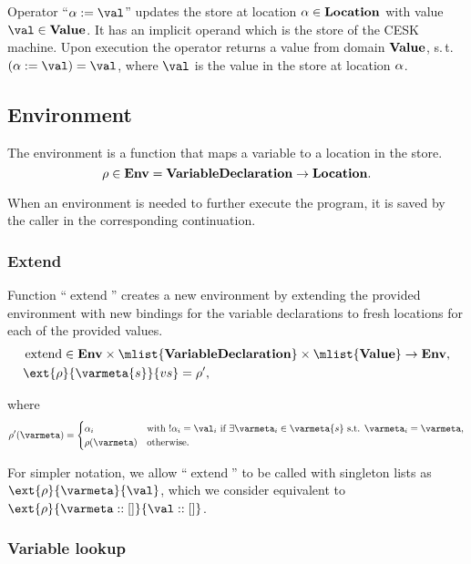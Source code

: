 \documentclass[a4paper,oneside]{article}
\DeclareMathOperator{\extend}{extend}
\begin{document}
\newcommand{\update}[2]{{#1} := {#2}}
Operator ``$\update{\loc}{\val}$'' updates the store at location $\alpha \in \mathbf{Location}$ with value $\val \in \dval$.
It has an implicit operand which is the store of the CESK machine.
Upon execution the operator returns a value from domain $\mathbf{Value}$, s.\,t. $(\update{\loc}{\val}) = \val$, where $\val$ is the value in the store at location $\alpha$.


\subsection{Environment}
\label{subsec:env-definition}

The environment is a function that maps a variable to a location in the store.
\[
    \rho \in \mathbf{Env} = \mathbf{VariableDeclaration} \rightarrow \mathbf{Location}.
\]

When an environment is needed to further execute the program, it is saved by the caller in the corresponding continuation.


\subsubsection{Extend}
\label{subsubsec:extend-env}

Function ``$\extend$'' creates a new environment by extending the provided environment with new bindings for the variable declarations to fresh locations for each of the provided values.
\begin{align*}
    &\extend \in \denv \times \mlist{\dvardecl} \times \mlist{\dval} \rightarrow  \denv,\\
    &\ext{\env}{\varmeta{s}}{\vals} = \env',
\end{align*}

\noindent where
\[
    \env'(\varmeta) =\begin{cases}
        \loc_i & \text{with }\deref{\loc_i} = \val_i\text{ if }\exists\varmeta_i \in \varmeta{s} \text{ s.t. } \varmeta_i = \varmeta,\\
        \env(\varmeta) &\text{otherwise}.
    \end{cases}
\]

For simpler notation, we allow ``$\extend$'' to be called with singleton lists as $\ext{\env}{\varmeta}{\val}$, which we consider equivalent to $\ext{\env}{\varmeta :: []}{\val :: []}$.


\subsubsection{Variable lookup}
\label{subsubsec:variable-lookup}
\end{document}
